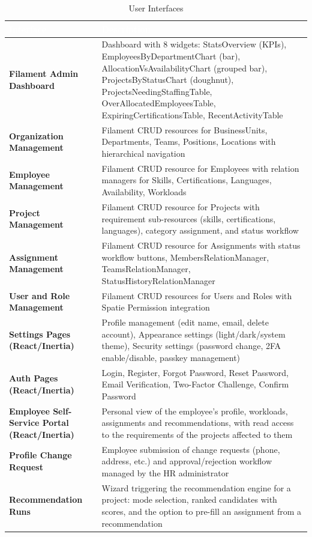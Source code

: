 \documentclass{bts-report}
\begin{document}
\begin{table}[H]
  \centering
  \caption{User Interfaces}
  \vspace{0.2cm}
  \begin{tabularx}{\textwidth}{|>{\bfseries}p{3.5cm}|X|}
    \hline
    \rowcolor{tableheader}
    \textcolor{white}{\textbf{Interface}} & \textcolor{white}{\textbf{Description}} \\
    \hline
    Filament Admin Dashboard & Dashboard with 8 widgets: StatsOverview (KPIs), EmployeesByDepartmentChart (bar), AllocationVsAvailabilityChart (grouped bar), ProjectsByStatusChart (doughnut), ProjectsNeedingStaffingTable, OverAllocatedEmployeesTable, ExpiringCertificationsTable, RecentActivityTable \\
    \hline
    Organization Management & Filament CRUD resources for BusinessUnits, Departments, Teams, Positions, Locations with hierarchical navigation \\
    \hline
    Employee Management & Filament CRUD resource for Employees with relation managers for Skills, Certifications, Languages, Availability, Workloads \\
    \hline
    Project Management & Filament CRUD resource for Projects with requirement sub-resources (skills, certifications, languages), category assignment, and status workflow \\
    \hline
    Assignment Management & Filament CRUD resource for Assignments with status workflow buttons, MembersRelationManager, TeamsRelationManager, StatusHistoryRelationManager \\
    \hline
    User and Role Management & Filament CRUD resources for Users and Roles with Spatie Permission integration \\
    \hline
    Settings Pages (React/Inertia) & Profile management (edit name, email, delete account), Appearance settings (light/dark/system theme), Security settings (password change, 2FA enable/disable, passkey management) \\
    \hline
    Auth Pages (React/Inertia) & Login, Register, Forgot Password, Reset Password, Email Verification, Two-Factor Challenge, Confirm Password \\
    \hline
    Employee Self-Service Portal (React/Inertia) & Personal view of the employee's profile, workloads, assignments and recommendations, with read access to the requirements of the projects affected to them \\
    \hline
    Profile Change Request & Employee submission of change requests (phone, address, etc.) and approval/rejection workflow managed by the HR administrator \\
    \hline
    Recommendation Runs & Wizard triggering the recommendation engine for a project: mode selection, ranked candidates with scores, and the option to pre-fill an assignment from a recommendation \\
    \hline
  \end{tabularx}
\end{table}
\end{document}
